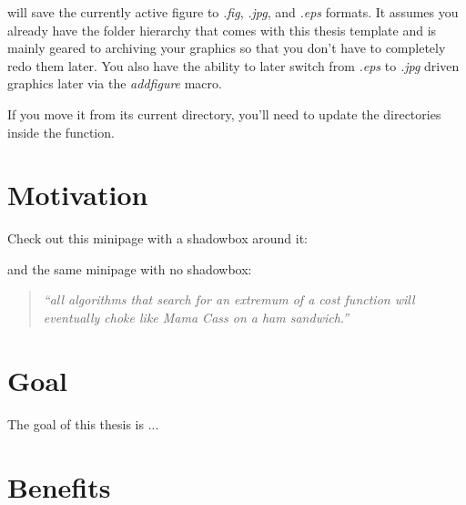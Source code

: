    will save the currently active figure to \textit{.fig}, \textit{.jpg}, and \textit{.eps} formats.  It assumes you already have the folder hierarchy that comes with this thesis template and is mainly geared to archiving your graphics so that you don't have to completely redo them later.  You also have the ability to later switch from \textit{.eps} to \textit{.jpg} driven graphics later via the \emph{addfigure} macro.

  If you move it from its current directory, you'll need to update the directories inside the function.

\section{Motivation}\label{sec:motive}

Check out this minipage with a shadowbox around it:
\vspace{.5cm}
\begin{center}
\end{center}

and the same minipage with no shadowbox:
\vspace{.5cm}
\begin{center}
\begin{minipage}{0.8\textwidth}
\begin{quote}
\textit{``all algorithms that search for an extremum of a cost function will eventually choke like Mama Cass on a ham sandwich.''} 
\end{quote}
\end{minipage}
\end{center}

\section{Goal}\label{sec:goal}

The goal of this thesis is ...

\section{Benefits}\label{sec:benefits}

